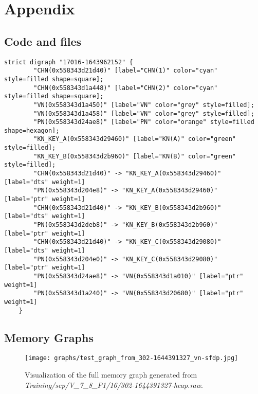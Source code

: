 \chapter*{Appendix}

\section{Code and files}

\begin{lstlisting}[style=text, caption={The DOT file of uncompressed block memgraph, here \textit{Training/basic/V\_7\_1\_P1/24/17016-1643962152-heap.raw}, with real addresses. Output is cropped.}, label={appendix:dot:17016-1643962152:cropped}]
    strict digraph "17016-1643962152" {
        "CHN(0x558343d21d40)" [label="CHN(1)" color="cyan" style=filled shape=square];
        "CHN(0x558343d1a448)" [label="CHN(2)" color="cyan" style=filled shape=square];
        "VN(0x558343d1a450)" [label="VN" color="grey" style=filled];
        "VN(0x558343d1a458)" [label="VN" color="grey" style=filled];
        "PN(0x558343d24ae8)" [label="PN" color="orange" style=filled shape=hexagon];
        "KN_KEY_A(0x558343d29460)" [label="KN(A)" color="green" style=filled];
        "KN_KEY_B(0x558343d2b960)" [label="KN(B)" color="green" style=filled];
        "CHN(0x558343d21d40)" -> "KN_KEY_A(0x558343d29460)" [label="dts" weight=1]
        "PN(0x558343d204e8)" -> "KN_KEY_A(0x558343d29460)" [label="ptr" weight=1]
        "CHN(0x558343d21d40)" -> "KN_KEY_B(0x558343d2b960)" [label="dts" weight=1]
        "PN(0x558343d2deb8)" -> "KN_KEY_B(0x558343d2b960)" [label="ptr" weight=1]
        "CHN(0x558343d21d40)" -> "KN_KEY_C(0x558343d29080)" [label="dts" weight=1]
        "PN(0x558343d204e0)" -> "KN_KEY_C(0x558343d29080)" [label="ptr" weight=1]
        "PN(0x558343d24ae8)" -> "VN(0x558343d1a010)" [label="ptr" weight=1]
        "PN(0x558343d1a240)" -> "VN(0x558343d20680)" [label="ptr" weight=1]
    }
\end{lstlisting}

\section{Memory Graphs}

\begin{figure}[H]\label{appendix:mem_graph:302-1644391327:full}
    \centering
    \texttt{[image: graphs/test\_graph\_from\_302-1644391327\_vn-sfdp.jpg]}
    \caption{Visualization of the full memory graph generated from \textit{Training/scp/V\_7\_8\_P1/16/302-1644391327-heap.raw}.}
\end{figure}

